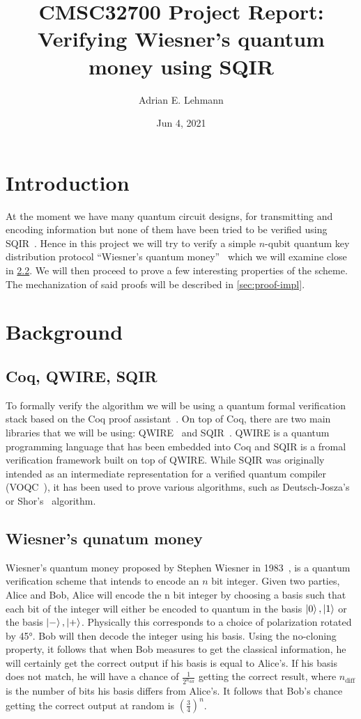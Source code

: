 \documentclass{article}
\title{CMSC32700 Project Report: Verifying Wiesner's quantum money using SQIR}
\author{Adrian E. Lehmann}
\date{Jun 4, 2021}
\begin{document}
\maketitle

\section{Introduction}
At the moment we have many quantum circuit designs, for transmitting and encoding information but none of them have been tried to be verified using SQIR~\cite{SQIR}. 
Hence in this project we will try to verify a simple $n$-qubit quantum key distribution protocol ``Wiesner's quantum money''~\cite{wiesner} which we will examine close in \cref{sec:wiesner}. 
We will then proceed to prove a few interesting properties of the scheme.
The mechanization of said proofs will be described in \cref{sec:proof-impl}.

\section{Background}

\subsection{Coq, QWIRE, SQIR}
To formally verify the algorithm we will be using a quantum formal verification stack based on the Coq proof assistant~\cite{Coq}.
On top of Coq, there are two main libraries that we will be using: QWIRE~\cite{QWIRE} and SQIR~\cite{SQIR}.
QWIRE is a quantum programming language that has been embedded into Coq and SQIR is a fromal verification framework built on top of QWIRE.
While SQIR was originally intended as an intermediate representation for a verified quantum compiler (VOQC~\cite{voqc}), it has been used to prove various algorithms, such as Deutsch-Josza's~\cite{deutsch} or Shor's~\cite{shor} algorithm.


\subsection{Wiesner's qunatum money}\label{sec:wiesner}

Wiesner's quantum money proposed by Stephen Wiesner in 1983~\cite{wiesner}, is a quantum verification scheme that intends to encode an $n$ bit integer. 
Given two parties, Alice and Bob, Alice will encode the n bit integer by choosing a basis such that each bit of the integer will either be encoded to quantum in the basis $\ket{0}, \ket{1}$ or the basis $\ket{-},\ket{+}$.
Physically this corresponds to a choice of polarization rotated by \ang{45}.
Bob will then decode the integer using his basis.
Using the no-cloning property, it follows that when Bob measures to get the classical information, he will certainly get the correct output if his basis is equal to Alice's.
If his basis does not match, he will have a chance of $\frac{1}{2^{n_{\text{diff}}}}$ getting the correct result, where $n_{\text{diff}}$ is the number of bits his basis differs from Alice's.
It follows that Bob's chance getting the correct output at random is $(\frac{3}{4})^n$.
\end{document}
